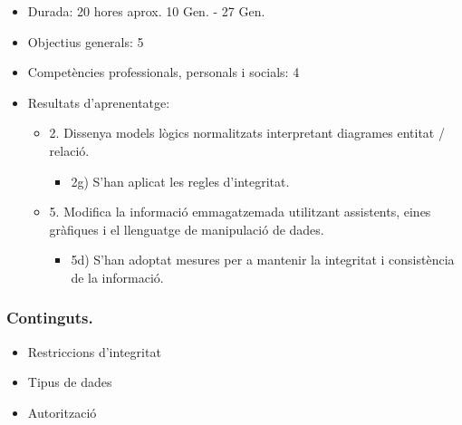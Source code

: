 \documentclass[catalan, a4paper, 12pt, titlepage]{article}
\begin{document}
  \begin{itemize}
	\item Durada: 20 hores aprox. 10 Gen. - 27 Gen.
	\item Objectius generals: 5
	\item Competències professionals, personals i socials: 4
	\item Resultats d'aprenentatge: 
		\begin{itemize}
			\item 2. Dissenya models lògics normalitzats interpretant diagrames entitat / relació.
				\begin{itemize}
					\item 2g) S'han aplicat les regles d'integritat.
				\end{itemize}
			\item 5. Modifica la informació emmagatzemada utilitzant assistents, eines gràfiques i el llenguatge de manipulació de dades.
				\begin{itemize}
					\item 5d) S'han adoptat mesures per a mantenir la integritat i consistència de la informació.
				\end{itemize}
		\end{itemize}
  \end{itemize}
  
  \subsubsection{Continguts.}
  \begin{itemize}
	  \item Restriccions d'integritat
	  \item Tipus de dades
	  \item Autorització
  \end{itemize}
\end{document}
